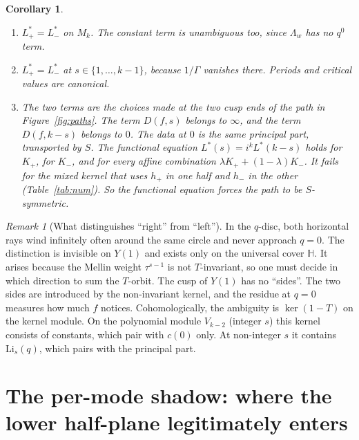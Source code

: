 \documentclass[11pt]{article}
\newtheorem{corollary}[theorem]{Corollary}
\theoremstyle{definition}
\theoremstyle{remark}
\newtheorem{remark}[theorem]{Remark}
\newcommand{\HH}{\mathbb{H}}
\newcommand{\Li}{\mathrm{Li}}
\begin{document}
\begin{corollary}\label{cor}
\begin{enumerate}
\item[(i)] $L^*_+=L^*_-$ on $M_k$. The constant term is unambiguous too, since $\Lambda_w$ has
no $q^0$ term.
\item[(ii)] $L^*_+=L^*_-$ at $s\in\{1,\dots,k-1\}$, because $1/\Gamma$ vanishes there. Periods and critical
values are canonical.
\item[(iii)] The two terms are the choices made at the two cusp ends of the path in
Figure~\ref{fig:paths}. The term $D(f,s)$ belongs to $\infty$, and the term $D(f,k-s)$ belongs to $0$. The
data at $0$ is the same principal part, transported by $S$. The functional equation
$L^*(s)=i^kL^*(k-s)$ holds for $K_+$, for $K_-$, and for every affine combination
$\lambda K_++(1-\lambda)K_-$. It \emph{fails} for the mixed kernel that uses $h_+$ in one half and
$h_-$ in the other (Table~\ref{tab:num}). So the functional equation forces the path to be
$S$-symmetric.
\end{enumerate}
\end{corollary}

\begin{remark}[What distinguishes ``right'' from ``left'']
In the $q$-disc, both horizontal rays wind infinitely often around the same circle and
never approach $q=0$. The distinction is invisible on $Y(1)$ and exists only on the
universal cover $\HH$. It arises because the Mellin weight $\tau^{s-1}$ is not
$T$-invariant, so one must decide in which direction to sum the $T$-orbit. The cusp of
$Y(1)$ has no ``sides''. The two sides are introduced by the non-invariant kernel, and
the residue at $q=0$ measures how much $f$ notices. Cohomologically, the ambiguity is
$\ker(1-T)$ on the kernel module. On the polynomial module $V_{k-2}$ (integer $s$) this
kernel consists of constants, which pair with $c(0)$ only. At non-integer $s$ it
contains $\Li_s(q)$, which pairs with the principal part.
\end{remark}

\section{The per-mode shadow: where the lower half-plane legitimately enters}\label{sec:modes}
\end{document}
